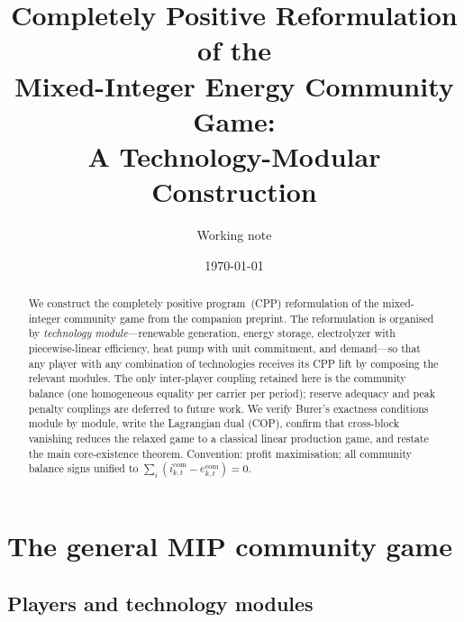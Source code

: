 \documentclass[11pt]{article}
\title{Completely Positive Reformulation of the\\
Mixed-Integer Energy Community Game:\\
A Technology-Modular Construction}
\author{Working note}
\date{\today}
\theoremstyle{definition}
\begin{document}
\maketitle

\begin{abstract}
We construct the completely positive program~(CPP) reformulation of the
mixed-integer community game from the companion preprint.  The reformulation
is organised by \emph{technology module}---renewable generation, energy
storage, electrolyzer with piecewise-linear efficiency, heat pump with unit
commitment, and demand---so that any player with any combination of
technologies receives its CPP lift by composing the relevant modules.  The
only inter-player coupling retained here is the community balance (one
homogeneous equality per carrier per period); reserve adequacy and peak
penalty couplings are deferred to future work.  We verify Burer's exactness
conditions module by module, write the Lagrangian dual (COP), confirm that
cross-block vanishing reduces the relaxed game to a classical linear
production game, and restate the main core-existence theorem.  Convention:
profit maximisation; all community balance signs unified to
$\sum_i(i^{\mathrm{com}}_{k,t}-e^{\mathrm{com}}_{k,t})=0$.
\end{abstract}

\section{The general MIP community game}
\label{sec:mip}

\subsection{Players and technology modules}
\end{document}
